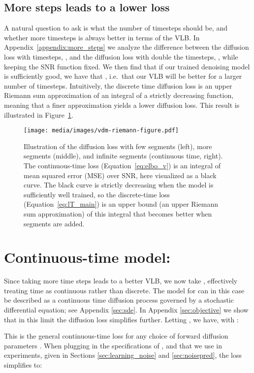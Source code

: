 \documentclass{article}
\def\Eqref#1{Equation~\ref{#1}}
\begin{document}
\subsection{More steps leads to a lower loss}
\label{sec:moresteps}
A natural question to ask is what the number of timesteps  should be, and whether more timesteps is always better in terms of the VLB. In Appendix~\ref{appendix:more_steps} we analyze the difference between the diffusion loss with  timesteps, , and the diffusion loss with double the timesteps, , while keeping the SNR function fixed. 
We then find that if our trained denoising model  is sufficiently good, we have that , i.e.\ that our VLB will be better for a larger number of timesteps. Intuitively, the discrete time diffusion loss is an upper Riemann sum  approximation of an integral of a strictly decreasing function, meaning that a finer approximation yields a lower diffusion loss. This result is illustrated in Figure~\ref{fig:more_steps_is_better}.
\begin{figure}[t]
\texttt{[image: media/images/vdm-riemann-figure.pdf]}
  \caption{
Illustration of the diffusion loss with few segments  (left), more segments  (middle), and infinite segments  (continuous time, right). The continuous-time loss (\Eqref{eq:elbo_v}) is an integral of mean squared error (MSE) over SNR, here visualized as a black curve. The black curve is strictly decreasing when the model is sufficiently well trained, so the discrete-time loss (\Eqref{eq:lT_main}) is an upper bound (an upper Riemann sum approximation) of this integral that becomes better when segments are added.}
  \label{fig:more_steps_is_better}
\end{figure}

\section{Continuous-time model: }

Since taking more time steps leads to a better VLB, we now take , effectively treating time  as continuous rather than discrete. The model for  can in this case be described as a continuous time diffusion process \citep{song2020score} governed by a stochastic differential equation; see Appendix \ref{sec:sde}. In Appendix \ref{sec:objective} we show that in this limit the diffusion loss  simplifies further. Letting , we have, with :

This is the general continuous-time loss for any choice of forward diffusion parameters . When plugging in the specifications of ,  and  that we use in experiments, given in Sections \ref{sec:learning_noise} and \ref{sec:noisepred}, the loss simplifies to:
\end{document}
